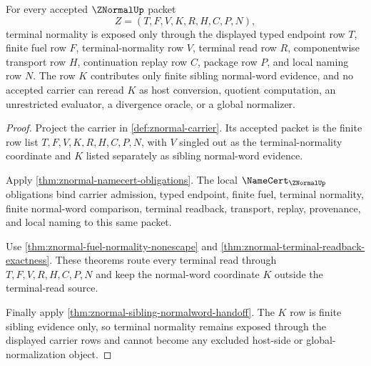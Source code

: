 \begin{theorem}
\label{thm:znormal-terminal-normality-carrier-exposure}
For every accepted $\ZNormalUp$ packet
$$
Z=(T,F,V,K,R,H,C,P,N),
$$
terminal normality is exposed only through the displayed typed endpoint row
$T$, finite fuel row $F$, terminal-normality row $V$, terminal read row $R$,
componentwise transport row $H$, continuation replay row $C$, package row $P$,
and local naming row $N$. The row $K$ contributes only finite sibling
normal-word evidence, and no accepted carrier can reread $K$ as host
conversion, quotient computation, an unrestricted evaluator, a divergence
oracle, or a global normalizer.
\end{theorem}
\begin{proof}
Project the carrier in \autoref{def:znormal-carrier}. Its accepted packet is
the finite row list $T,F,V,K,R,H,C,P,N$, with $V$ singled out as the
terminal-normality coordinate and $K$ listed separately as sibling
normal-word evidence.

Apply \autoref{thm:znormal-namecert-obligations}. The local
$\NameCert_{\ZNormalUp}$ obligations bind carrier admission, typed endpoint,
finite fuel, terminal normality, finite normal-word comparison, terminal
readback, transport, replay, provenance, and local naming to this same packet.

Use \autoref{thm:znormal-fuel-normality-nonescape} and
\autoref{thm:znormal-terminal-readback-exactness}. These theorems route every
terminal read through $T,F,V,R,H,C,P,N$ and keep the normal-word coordinate
$K$ outside the terminal-read source.

Finally apply \autoref{thm:znormal-sibling-normalword-handoff}. The $K$ row
is finite sibling evidence only, so terminal normality remains exposed through
the displayed carrier rows and cannot become any excluded host-side or
global-normalization object.
\end{proof}

